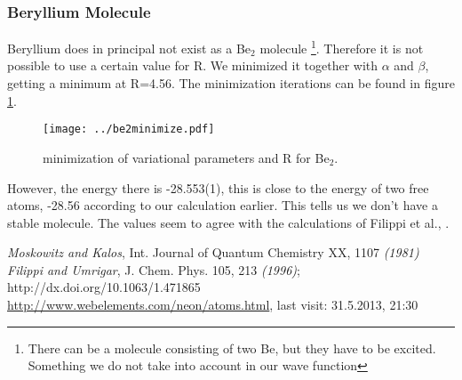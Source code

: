 \documentclass[a4paper,10pt]{article}
\begin{document}
\subsubsection{Beryllium Molecule}

Beryllium does in principal not exist as a Be$_2$ molecule
\footnote{There can be a molecule consisting of two Be, but they have to be excited. 
Something we do not take into account in our wave function}. 
Therefore it is not possible to use a certain value for R.
We minimized it together with $\alpha$ and $\beta$, getting a minimum at R=4.56. 
The minimization iterations can be found in figure \ref{minBe2}.
\begin{figure}[hbtp]
 \texttt{[image: ../be2minimize.pdf]}
 \label{minBe2}
 \caption{minimization of variational parameters and R for Be$_2$.}
\end{figure}

However, the energy there is -28.553(1), this is close to the energy of two free atoms, -28.56 according to our calculation earlier. 
This tells us we don't have a stable molecule. The values seem to agree with the calculations of Filippi et al., \cite{Filippi}.
\newpage

\begin{thebibliography}{99}
 \emph{Moskowitz and Kalos}, Int. Journal of Quantum Chemistry XX, 1107 \emph{(1981)}
  \emph{Filippi and Umrigar}, J. Chem. Phys. 105, 213 \emph{(1996)}; http://dx.doi.org/10.1063/1.471865
  \href{http://www.webelements.com/neon/atoms.html}{http://www.webelements.com/neon/atoms.html}, last visit: 31.5.2013, 21:30

\end{thebibliography}
\end{document}
